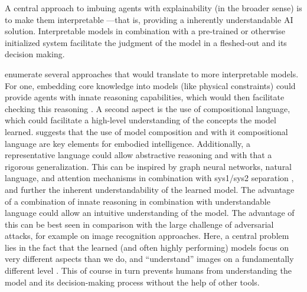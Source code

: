 \documentclass[twoside,11pt]{article}
\begin{document}
\begin{enumerate}
A central approach to imbuing agents with explainability (in the broader sense) is to make them interpretable ---that is, providing a inherently understandable AI solution. Interpretable models in combination with a pre-trained or otherwise initialized system facilitate the judgment of the model in a fleshed-out and its decision making.

\citet{RoyEtAl:2021:RLRoboticsChallenges} enumerate several approaches that would translate to more interpretable models. For one, embedding core knowledge into models (like physical constraints) could provide agents with innate reasoning capabilities, which would then facilitate checking this reasoning \citep{HaSchmidhuber:2018:CoreKnowledgeWorldModels}. A second aspect is the use of compositional language, which could facilitate a high-level understanding of the concepts the model learned. \citet{Koditschek:2021:RoboticsCompositionalLanguage} suggests that the use of model composition and with it compositional language are key elements for embodied intelligence.
Additionally, a representative language could allow abstractive reasoning and with that a rigorous generalization. This can be inspired by graph neural networks, natural language, and attention mechanisms in combination with sys1/sys2 separation \citep{RoyEtAl:2021:RLRoboticsChallenges}, and further the inherent understandability of the learned model.
The advantage of a combination of innate reasoning in combination with understandable language could allow an intuitive understanding of the model. The advantage of this can be best seen in comparison with the large challenge of adversarial attacks, for example on image recognition approaches. Here, a central problem lies in the fact that the learned (and often highly performing) models focus on very different aspects than we do, and ``understand'' images on a fundamentally different level \citep{ChakrabortyEtAl:2021:SurveyAdversarialAttacks}. This of course in turn prevents humans from understanding the model and its decision-making process without the help of other tools.


\end{enumerate}
\end{document}

